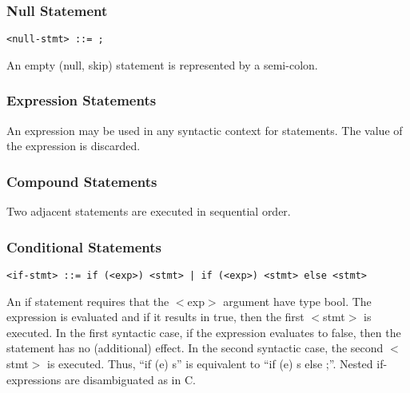 \documentclass[titlepage,10pt]{article}
\begin{document}
\subsubsection{Null Statement}


\begin{verbatim}
<null-stmt> ::= ;
\end{verbatim}

An empty (null, skip) statement is represented by a semi-colon.


\subsubsection{Expression Statements}

An expression may be used in any syntactic context for statements.   The
value of the expression is discarded.


\subsubsection{Compound Statements}

Two adjacent statements are executed in sequential order.


\subsubsection{Conditional Statements}


\begin{verbatim}
<if-stmt> ::= if (<exp>) <stmt> | if (<exp>) <stmt> else <stmt>
\end{verbatim}

An if statement requires that the $<$exp$>$ argument have type bool.
The expression is evaluated and if it results in true, then the first
$<$stmt$>$ is executed.  In the first syntactic case, if the expression
evaluates to false, then the statement has no (additional) effect.  In
the second syntactic case, the second $<$stmt$>$ is executed.  Thus,
``if (e) s'' is equivalent to ``if (e) s else ;''.  Nested
if-expressions are disambiguated as in C.
\end{document}
